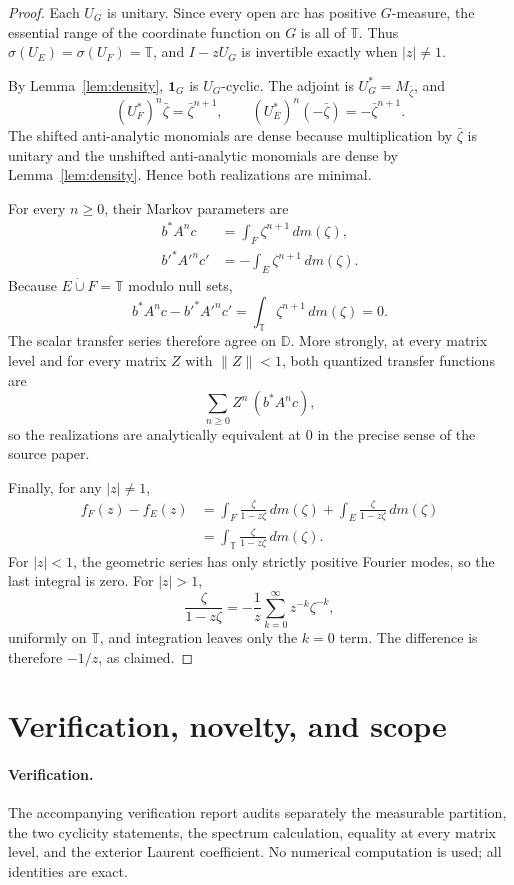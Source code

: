 \documentclass[11pt]{article}
\newcommand{\T}{\mathbb T}
\newcommand{\D}{\mathbb D}
\newcommand{\one}{\mathbf 1}
\begin{document}
\begin{proof}
Each $U_G$ is unitary. Since every open arc has positive $G$-measure, the
essential range of the coordinate function on $G$ is all of $\T$. Thus
$\sigma(U_E)=\sigma(U_F)=\T$, and $I-zU_G$ is invertible exactly when
$|z|\neq1$.

By Lemma~\ref{lem:density}, $\one_G$ is $U_G$-cyclic. The adjoint is
$U_G^*=M_{\bar\zeta}$, and
\[
        (U_F^*)^n\bar\zeta=\bar\zeta^{n+1},\qquad
        (U_E^*)^n(-\bar\zeta)=-\bar\zeta^{n+1}.
\]
The shifted anti-analytic monomials are dense because multiplication by
$\bar\zeta$ is unitary and the unshifted anti-analytic monomials are dense by
Lemma~\ref{lem:density}. Hence both realizations are minimal.

For every $n\geq0$, their Markov parameters are
\begin{align*}
 b^*A^n c&=\int_F \zeta^{n+1}\,dm(\zeta),\\
 b'^*A'^n c'&=-\int_E \zeta^{n+1}\,dm(\zeta).
\end{align*}
Because $E\mathbin{\dot\cup}F=\T$ modulo null sets,
\[
 b^*A^n c-b'^*A'^n c'
   =\int_{\T}\zeta^{n+1}\,dm(\zeta)=0.
\]
The scalar transfer series therefore agree on $\D$. More strongly, at every
matrix level and for every matrix $Z$ with $\lVert Z\rVert<1$, both quantized
transfer functions are
\[
                 \sum_{n\geq0} Z^n\,(b^*A^n c),
\]
so the realizations are analytically equivalent at $0$ in the precise sense
of the source paper.

Finally, for any $|z|\neq1$,
\begin{align*}
 f_F(z)-f_E(z)
 &=\int_F\frac{\zeta}{{1-z\zeta}}\,dm(\zeta)
   +\int_E\frac{\zeta}{1-z\zeta}\,dm(\zeta)\\
 &=\int_{\T}\frac{\zeta}{1-z\zeta}\,dm(\zeta).
\end{align*}
For $|z|<1$, the geometric series has only strictly positive Fourier modes,
so the last integral is zero. For $|z|>1$,
\[
 \frac{\zeta}{1-z\zeta}
   =-\frac1z\sum_{k=0}^{\infty}z^{-k}\zeta^{-k},
\]
uniformly on $\T$, and integration leaves only the $k=0$ term. The difference
is therefore $-1/z$, as claimed.
\end{proof}

\section{Verification, novelty, and scope}

\paragraph{Verification.}
The accompanying verification report audits separately the measurable
partition, the two cyclicity statements, the spectrum calculation, equality
at every matrix level, and the exterior Laurent coefficient. No numerical
computation is used; all identities are exact.
\end{document}
